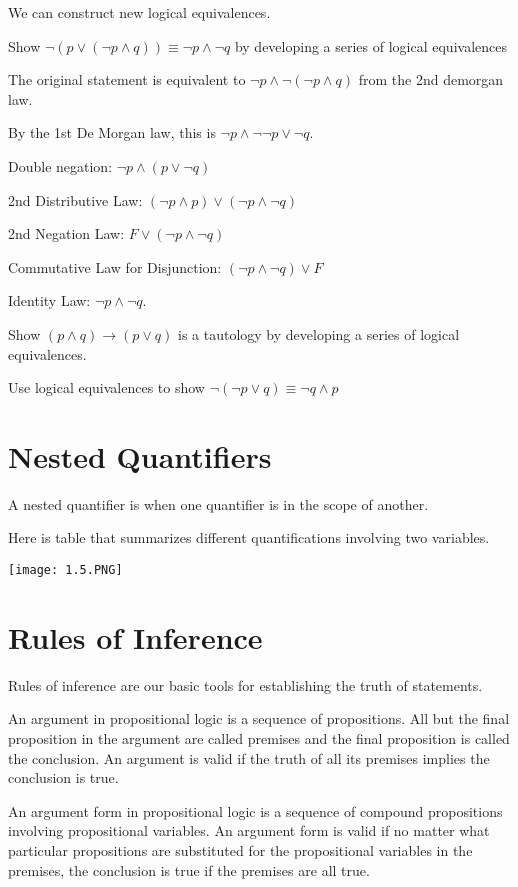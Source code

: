 \documentclass[../discrete.tex]{subfiles}
\begin{document}
We can construct new logical equivalences.
\begin{example}
    Show $\neg(p\lor (\neg p\land q))\equiv \neg p\land \neg q$ by developing a series of logical equivalences 
    
    The original statement is equivalent to $\neg p\land \neg(\neg p\land q)$ from the 2nd demorgan law.
    
    By the 1st De Morgan law, this is $\neg p\land \neg\neg p\lor \neg q$.

    Double negation: $\neg p\land (p\lor \neg q)$

    2nd Distributive Law: $(\neg p\land p)\lor (\neg p\land \neg q)$

    2nd Negation Law: $F\lor (\neg p\land \neg q)$

    Commutative Law for Disjunction: $(\neg p\land \neg q)\lor F$

    Identity Law: $\neg p\land \neg q$.
\end{example}

\ex Show $(p\land q)\rightarrow (p\lor q)$ is a tautology by developing a series of logical equivalences.

\ex Use logical equivalences to show $\neg(\neg p\lor q)\equiv \neg q\land p$


\section{Nested Quantifiers}
A nested quantifier is when one quantifier is in the scope of another.

Here is table that summarizes different quantifications involving two variables.
\begin{center}
    \texttt{[image: 1.5.PNG]}
\end{center}

\section{Rules of Inference}
Rules of inference are our basic tools for establishing the truth of statements.

An argument in propositional logic is a sequence of propositions. All but the final proposition in the 
argument are called premises and the final proposition is called the conclusion. An argument is valid 
if the truth of all its premises implies the conclusion is true.

An argument form in propositional logic is a sequence of compound propositions involving propositional 
variables. An argument form is valid if no matter what particular propositions are substituted for the 
propositional variables in the premises, the conclusion is true if the premises are all true.
\end{document}
